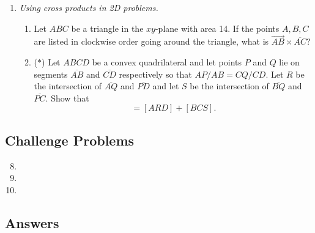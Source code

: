 \begin{enumerate}
\begin{enumerate}
\end{enumerate}
\item \emph{Using cross products in 2D problems.}
\begin{enumerate}
\item Let $ABC$ be a triangle in the $xy$-plane with area 14. If the points $A,B,C$ are listed in clockwise order going around the triangle, what is $\overrightarrow{AB}\times\overline{AC}$?
\item ($*$) Let $ABCD$ be a convex quadrilateral and let points $P$ and $Q$ lie on segments $\overline{AB}$ and $\overline{CD}$ respectively so that $AP/AB = CQ/CD$. Let $R$ be the intersection of $\overline{AQ}$ and $\overline{PD}$ and let $S$ be the intersection of $\overline{BQ}$ and $\overline{PC}$. Show that
\begin{equation*}
[PSQR] = [ARD] + [BCS].
\end{equation*}
\end{enumerate}
\end{enumerate}


\newpage
\subsection{Challenge Problems}

\begin{enumerate}\setcounter{enumi}{7}
\item %
\item %
\item %
\end{enumerate}


\newpage
\subsection{Answers}

